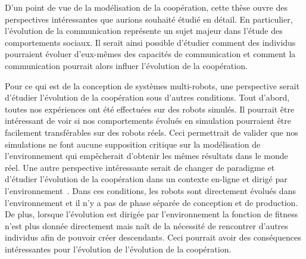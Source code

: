 		D'un point de vue de la modélisation de la coopération, cette thèse ouvre des perspectives intéressantes que aurions souhaité étudié en détail. En particulier, l'évolution de la communication représente un sujet majeur dans l'étude des comportements sociaux. Il serait ainsi possible d'étudier comment des individus pourraient évoluer d'eux-mêmes des capacités de communication et comment la communication pourrait alors influer l'évolution de la coopération. 

		Pour ce qui est de la conception de systèmes multi-robots, une perspective serait d'étudier l'évolution de la coopération sous d'autres conditions. Tout d'abord, toutes nos expériences ont été effectuées sur des robots simulés. Il pourrait être intéressant de voir si nos comportements évolués en simulation pourraient être facilement transférables sur des robots réels. Ceci permettrait de valider que nos simulations ne font aucune supposition critique sur la modélisation de l'environnement qui empêcherait d'obtenir les mêmes résultats dans le monde réel. Une autre perspective intéressante serait de changer de paradigme et d'étudier l'évolution de la coopération dans un contexte en-ligne et dirigé par l'environnement~\parencite{Montanier2011, Montanier2013}. Dans ces conditions, les robots sont directement évolués dans l'environnement et il n'y a pas de phase séparée de conception et de production. De plus, lorsque l'évolution est dirigée par l'environnement la fonction de fitness n'est plus donnée directement mais naît de la nécessité de rencontrer d'autres individus afin de pouvoir créer descendants. Ceci pourrait avoir des conséquences intéressantes pour l'évolution de l'évolution de la coopération.